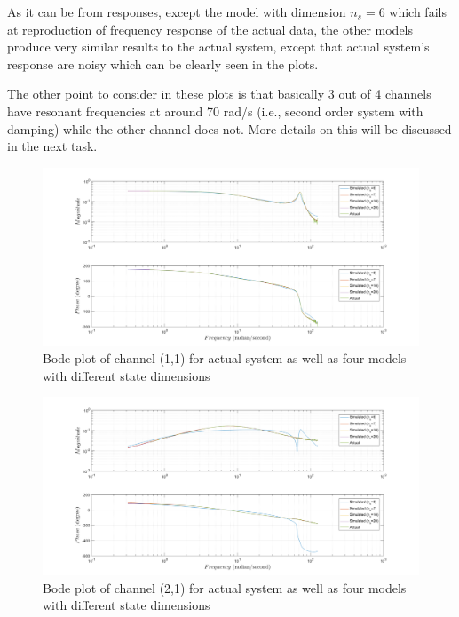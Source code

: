 \documentclass[paper=US leter, fontsize=11pt]{scrartcl}
\begin{document}
As it can be from responses, except the model with dimension $n_{s}=6$ which fails at reproduction of frequency response of the actual data, the other models produce very similar results to the actual system, except that actual system's response are noisy which can be clearly seen in the plots.

The other point to consider in these plots is that basically 3 out of 4 channels have resonant frequencies at around 70 rad/s (i.e., second order system with damping) while the other channel does not. More details on this will be discussed in the next task.

\begin{figure}[ht!]  
	\centering    
	\includegraphics[scale=0.4,trim={5cm 0 0 0},clip]{task131.png}  
	\caption{Bode plot of channel (1,1) for actual system as well as four models with different state dimensions}
	\label{task123} 
\end{figure} 

\begin{figure}[ht!]  
	\centering    
	\includegraphics[scale=0.4,trim={5cm 0 0 0},clip]{task132.png}  
	\caption{Bode plot of channel (2,1) for actual system as well as four models with different state dimensions}
	\label{task123} 
\end{figure} 
\end{document}
